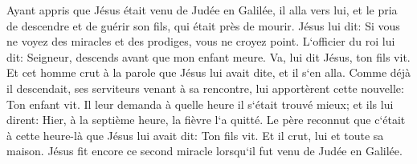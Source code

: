 \verse Ayant appris que Jésus était venu de Judée en Galilée, il alla vers lui, et le pria de descendre et de guérir son fils, qui était près de mourir. 
\verse Jésus lui dit: Si vous ne voyez des miracles et des prodiges, vous ne croyez point. 
\verse L`officier du roi lui dit: Seigneur, descends avant que mon enfant meure. 
\verse Va, lui dit Jésus, ton fils vit. Et cet homme crut à la parole que Jésus lui avait dite, et il s`en alla. 
\verse Comme déjà il descendait, ses serviteurs venant à sa rencontre, lui apportèrent cette nouvelle: Ton enfant vit. 
\verse Il leur demanda à quelle heure il s`était trouvé mieux; et ils lui dirent: Hier, à la septième heure, la fièvre l`a quitté. 
\verse Le père reconnut que c`était à cette heure-là que Jésus lui avait dit: Ton fils vit. Et il crut, lui et toute sa maison. 
\verse Jésus fit encore ce second miracle lorsqu`il fut venu de Judée en Galilée. 

\chapter{}


